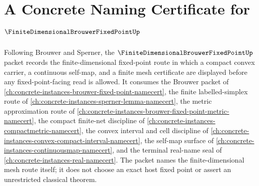 \chapter{A Concrete Naming Certificate for $\FiniteDimensionalBrouwerFixedPointUp$}
\label{ch:concrete-instances-finite-dimensional-brouwer-fixed-point-namecert}

Following Brouwer and Sperner, the $\FiniteDimensionalBrouwerFixedPointUp$ packet records the finite-dimensional fixed-point route in which a compact convex carrier, a continuous self-map, and a finite mesh certificate are displayed before any fixed-point-facing read is allowed. It consumes the Brouwer packet of \autoref{ch:concrete-instances-brouwer-fixed-point-namecert}, the finite labelled-simplex route of \autoref{ch:concrete-instances-sperner-lemma-namecert}, the metric approximation route of \autoref{ch:concrete-instances-brouwer-fixed-point-metric-namecert}, the compact finite-net discipline of \autoref{ch:concrete-instances-compactmetric-namecert}, the convex interval and cell discipline of \autoref{ch:concrete-instances-convex-compact-interval-namecert}, the self-map surface of \autoref{ch:concrete-instances-continuousmap-namecert}, and the terminal real-name seal of \autoref{ch:concrete-instances-real-namecert}. The packet names the finite-dimensional mesh route itself; it does not choose an exact host fixed point or assert an unrestricted classical theorem.

